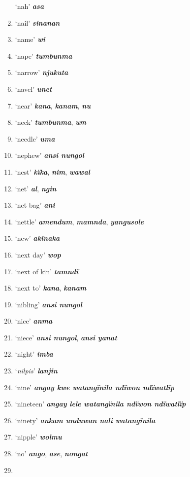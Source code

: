 \begin{enumerate}[noitemsep, label={}, align=left, widest=190, labelsep=1ex,leftmargin=*,itemindent=-10pt]
‘nah’ \textbf{\textit{asa}} \item
‘nail’ \textbf{\textit{sinanan}} \item
‘name’ \textbf{\textit{wi}} \item
‘nape’ \textbf{\textit{tumbunma}} \item
‘narrow’ \textbf{\textit{njukuta}} \item
‘navel’ \textbf{\textit{unet}} \item
‘near’ \textbf{\textit{kana}}, \textbf{\textit{kanam}}, \textbf{\textit{nu}} \item
‘neck’ \textbf{\textit{tumbunma}}, \textbf{\textit{um}} \item
‘needle’ \textbf{\textit{uma}} \item
‘nephew’ \textbf{\textit{ansi nungol}} \item
‘nest’ \textbf{\textit{kïka}}, \textbf{\textit{nim}}, \textbf{\textit{wawal}} \item
‘net’ \textbf{\textit{al}}, \textbf{\textit{ngin}} \item
‘net bag’ \textbf{\textit{ani}} \item
‘nettle’ \textbf{\textit{amendum}}, \textbf{\textit{mamnda}}, \textbf{\textit{yangusole}} \item
‘new’ \textbf{\textit{akïnaka}} \item
‘next day’ \textbf{\textit{wop}} \item
‘next of kin’ \textbf{\textit{tamndï}} \item
‘next to’ \textbf{\textit{kana}}, \textbf{\textit{kanam}} \item
‘nibling’ \textbf{\textit{ansi nungol}} \item
‘nice’ \textbf{\textit{anma}} \item
‘niece’ \textbf{\textit{ansi nungol}}, \textbf{\textit{ansi yanat}} \item
‘night’ \textbf{\textit{imba}} \item
‘\textit{nilpis}’ \textbf{\textit{lanjin}} \item
‘nine’ \textbf{\textit{angay kwe watangïnila ndïwon ndïwatlïp}} \item
‘nineteen’ \textbf{\textit{angay lele watangïnila ndïwon ndïwatlïp}} \item
‘ninety’ \textbf{\textit{ankam unduwan nali watangïnila}} \item
‘nipple’ \textbf{\textit{wolmu}} \item
‘no’ \textbf{\textit{ango}}, \textbf{\textit{ase}}, \textbf{\textit{nongat}} \item

\end{enumerate}
